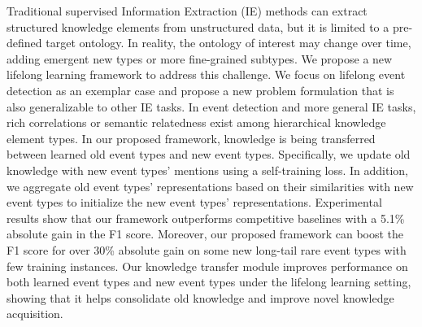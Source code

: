 Traditional supervised Information Extraction (IE) methods can extract structured knowledge elements from unstructured data, but it is limited to a pre-defined target ontology. In reality, the ontology of interest may change over time, adding emergent new types or more fine-grained subtypes. We propose a new lifelong learning framework to address this challenge. We focus on lifelong event detection as an exemplar case and propose a new problem formulation that is also generalizable to other IE tasks. In event detection and more general IE tasks, rich correlations or semantic relatedness exist among hierarchical knowledge element types. In our proposed framework, knowledge is being transferred between learned old event types and new event types. Specifically, we update old knowledge with new event types' mentions using a self-training loss. In addition, we aggregate old event types' representations based on their similarities with new event types to initialize the new event types' representations. Experimental results show that our framework outperforms competitive baselines with a 5.1\% absolute gain in the F1 score. Moreover, our proposed framework can boost the F1 score for over 30\% absolute gain on some new long-tail rare event types with few training instances. Our knowledge transfer module improves performance on both learned event types and new event types under the lifelong learning setting, showing that it helps consolidate old knowledge and improve novel knowledge acquisition.
